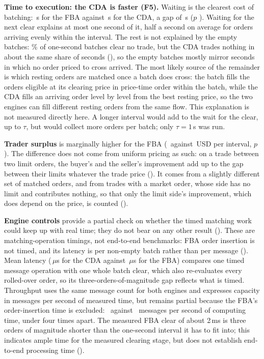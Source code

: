 \textbf{Time to execution: the CDA is faster (F5).} Waiting is the
clearest cost of batching:
\ResTimeToExecFba\,s for the FBA against \ResTimeToExecCda\,s for the CDA, a
gap of \ResTimeToExecDiff\,s ($p$ \ResTimeToExecP). Waiting for the next
clear explains at most one second of it, half a second on average for
orders arriving evenly within the interval. The rest is not explained by
the empty batches: \FbaEmptyBatchShare\% of one-second batches clear no
trade, but the CDA trades nothing in about the same share of seconds
(), so the empty batches mostly mirror seconds in which
no order priced to cross arrived. The most likely source of the remainder
is which resting orders are matched once a batch does cross: the batch
fills the orders eligible at its clearing price in price-time order within
the batch, while the CDA fills an arriving order level by level from the
best resting price, so the two engines can fill different resting orders
from the same flow. This explanation is not measured directly here. A longer interval would add to the wait
for the clear, up to $\tau$, but would collect more orders per batch;
only $\tau = 1$\,s was run.

\textbf{Trader surplus} is marginally higher for the FBA
(\ResTraderSurplusFba\ against \ResTraderSurplusCda\,USD per interval, $p$
\ResTraderSurplusP). The difference does not come from uniform pricing as
such: on a trade between two limit orders, the buyer's and the seller's
improvement add up to the gap between their limits whatever the trade price
(). It comes from a slightly different set of
matched orders, and from trades with a market order, whose side has no
limit and contributes nothing, so that only the limit side's improvement,
which does depend on the price, is counted ().

\textbf{Engine controls} provide a partial check on whether the timed
matching work could keep up with real time; they do not bear on any other result
(). These are matching-operation timings, not
end-to-end benchmarks: FBA order insertion is not timed, and its latency
is per non-empty batch rather than per message ().
Mean latency (\ResClearingLatencyCda\,$\mu$s
for the CDA against \ResClearingLatencyFba\,$\mu$s for the FBA) compares
one timed message operation with one whole batch clear, which also
re-evaluates every rolled-over order, so its three-orders-of-magnitude gap
reflects what is timed.
Throughput uses the same message count for both engines and expresses
capacity in messages per second of measured time, but remains partial
because the FBA's order-insertion time is excluded:
\ResThroughputCda\ against \ResThroughputFba\ messages per second of
computing time, under four times apart. The measured FBA clear of about
2\,ms is three orders of magnitude shorter than the one-second interval
it has to fit into; this indicates ample time for the measured clearing
stage, but does not establish end-to-end processing time
().

